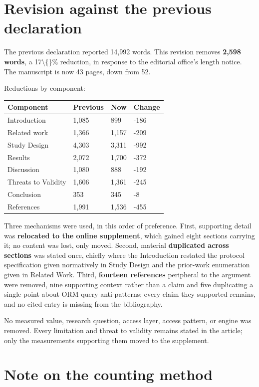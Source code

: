 \documentclass[11pt,a4paper]{article}
\begin{document}
\section*{Revision against the previous declaration}

The previous declaration reported 14,992 words. This revision removes \textbf{2,598 words}, a 17\textbackslash\{\}\% reduction, in response to the editorial office's length notice. The manuscript is now 43 pages, down from 52.

Reductions by component:

\begin{center}\begin{tabular}{llll}
\hline
Component & Previous & Now & Change \\
\hline
Introduction & 1,085 & 899 & -186 \\
Related work & 1,366 & 1,157 & -209 \\
Study Design & 4,303 & 3,311 & -992 \\
Results & 2,072 & 1,700 & -372 \\
Discussion & 1,080 & 888 & -192 \\
Threats to Validity & 1,606 & 1,361 & -245 \\
Conclusion & 353 & 345 & -8 \\
References & 1,991 & 1,536 & -455 \\
\hline
\end{tabular}\end{center}

Three mechanisms were used, in this order of preference. First, supporting detail was \textbf{relocated to the online supplement}, which gained eight sections carrying it; no content was lost, only moved. Second, material \textbf{duplicated across sections} was stated once, chiefly where the Introduction restated the protocol specification given normatively in Study Design and the prior-work enumeration given in Related Work. Third, \textbf{fourteen references} peripheral to the argument were removed, nine supporting context rather than a claim and five duplicating a single point about ORM query anti-patterns; every claim they supported remains, and no cited entry is missing from the bibliography.

No measured value, research question, access layer, access pattern, or engine was removed. Every limitation and threat to validity remains stated in the article; only the measurements supporting them moved to the supplement.

\section*{Note on the counting method}
\end{document}
